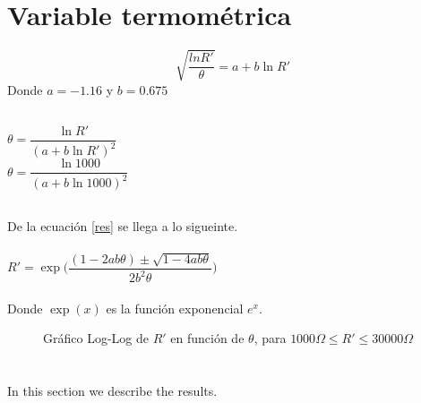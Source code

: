 \documentclass[12pt]{article}
\begin{document}
\section{Variable termométrica}
\begin{equation} \label{res}
\sqrt{\dfrac{ln{R'}}{\theta}}=a+b \ln{R'}  
\end{equation}
Donde $a=-1.16$ y $b=0.675$
\subsection{}
\begin{center}
  $\theta =\dfrac {\ln{R'}}{{(a+b \ln{R'})}^2}$\\
  $\theta =\dfrac {\ln{1000}}{{(a+b \ln{1000})}^2}$
\end{center}

\subsection{}
De la ecuación \eqref{res} se llega a lo sigueinte.\\
\\$R'=\exp{\Big(\dfrac{(1-2ab\theta)\pm \sqrt{1-4ab\theta}}{2b^2\theta}\Big)}$
\\ \\Donde $\exp(x)$ es la función exponencial $e^x$.
\begin{figure}[H]
  \centering
  \scalebox{.9}{}
  \caption{Gráfico Log-Log de $R'$ en función de $\theta$, para $1000 \Omega \leq R' \leq 30000 \Omega$}
\end{figure}
\section{}
In this section we describe the results.
\end{document}
